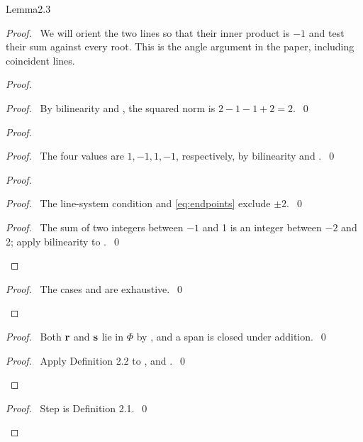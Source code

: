 \begin{cgss}{Lemma}{2.3}\label{lem:2.3}
\end{cgss}
\begin{proof}
 \pfsketch\ We will orient the two lines so that their inner product is $-1$ and test their
 sum against every root. This is the angle argument in the paper, including coincident lines.
 \begin{proof}
  \begin{proof}
   \pf\ By bilinearity and , the squared norm is $2-1-1+2=2$.~\qed
  \end{proof}
  \begin{proof}
   \begin{proof}
    \pf\ The four values are $1,-1,1,-1$, respectively, by bilinearity and .~\qed
   \end{proof}
   \begin{proof}
    \begin{proof}
     \pf\ The line-system condition and \eqref{eq:endpoints} exclude $\pm2$.~\qed
    \end{proof}
    \qedstep
    \begin{proof}
     \pf\ The sum of two integers between $-1$ and 1 is an integer between $-2$ and 2;
     apply bilinearity to .~\qed
    \end{proof}
   \end{proof}
   \qedstep
   \begin{proof}\pf\ The cases  and  are exhaustive.~\qed\end{proof}
  \end{proof}
  \begin{proof}
   \pf\ Both ${\mathbf r}$ and ${\mathbf s}$ lie in $\Phi$ by , and a span is closed under
   addition.~\qed
  \end{proof}
  \qedstep
  \begin{proof}\pf\ Apply Definition 2.2 to ,  and
   .~\qed\end{proof}
 \end{proof}
 \qedstep
 \begin{proof}\pf\ Step  is Definition 2.1.~\qed\end{proof}
\end{proof}

